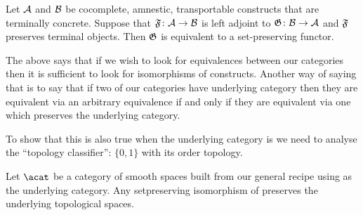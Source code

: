 \documentclass[%
12pt,%
arxiv,%
defaults
]{myclass}
\begin{document}
\begin{proposition}
Let \(\mathcal{A}\) and \(\mathcal{B}\) be cocomplete, amnestic, transportable constructs that are terminally concrete.
Suppose that \(\func{F} \colon \m{A} \to \m{B}\) is left adjoint to \(\func{G} \colon \m{B} \to \m{A}\) and \(\func{F}\) preserves terminal objects.
Then \(\func{G}\) is equivalent to a set\hyp{}preserving functor. \noproof
\end{proposition}

The above says that if we wish to look for equivalences between our categories then it is sufficient to look for isomorphisms of constructs.
Another way of saying that is to say that if two of our categories have underlying category \xcat then they are equivalent via an arbitrary equivalence if and only if they are equivalent via one which preserves the underlying category.

To show that this is also true when the underlying category is \ycat we need to analyse the ``topology classifier'': \(\{0, 1\}\) with its order topology.


\begin{proposition}
Let \(\acat\) be a category of smooth spaces built from our general recipe using \ycat as the underlying category.
Any set\enhyp{}preserving isomorphism of \acat preserves the underlying topological spaces.
\end{proposition}
\end{document}
